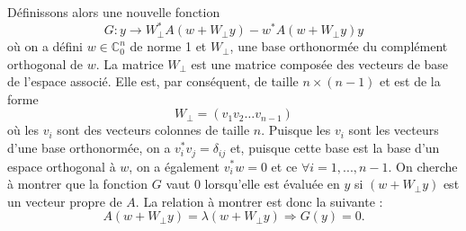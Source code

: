 
Définissons alors une nouvelle fonction
\begin{equation} \label{eq_point4_q1}
 G:y \rightarrow W_{\bot}^* A(w+ W_{\bot}y) - w^*A(w+ W_{\bot}y)y
\end{equation}
où on a défini $w \in \mathbb{C}_0^n$ de norme 1 et $W_{\bot}$, une base orthonormée du complément orthogonal de $w$. La matrice $W_{\bot}$ est une matrice composée des vecteurs de base de l'espace associé. Elle est, par conséquent, de taille $n \times (n-1)$ et est de la forme $$W_{\bot} = (v_1 v_2 \hdots v_{n-1})$$ où les $v_i$ sont des vecteurs colonnes de taille $n$. Puisque les $v_i$ sont les vecteurs d'une base orthonormée, on a $v_i^*v_j = \delta_{ij}$ et, puisque cette base est la base d'un espace orthogonal à $w$, on a également $v_i^*w = 0$ et ce $\forall i = 1,...,n-1$.%
On cherche à montrer que la fonction $G$ vaut $0$ lorsqu'elle est évaluée en $y$ si $(w+ W_{\bot}y)$ est un vecteur propre de $A$. La relation à montrer est donc la suivante : $$A(w+ W_{\bot}y) = \lambda (w+ W_{\bot}y) \Rightarrow G(y)=0.$$

